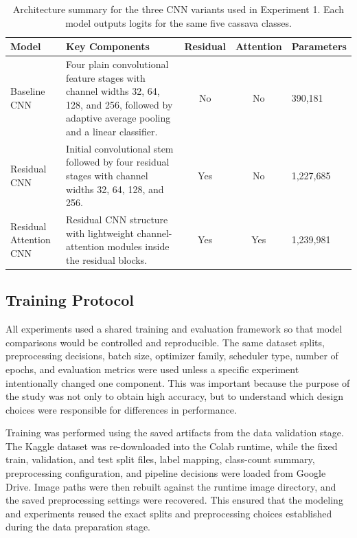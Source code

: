 \documentclass[11pt]{article}
\begin{document}
\begin{table}[htbp]
    \centering
    \small
    \caption{Architecture summary for the three CNN variants used in Experiment 1. Each model outputs logits for the same five cassava classes.}
    \label{tab:architecture_summary}
    \begin{tabularx}{\textwidth}{L{0.20\textwidth}>{\raggedright\arraybackslash}XccL{0.13\textwidth}}
        \toprule
        Model & Key Components & Residual & Attention & Parameters \\
        \midrule
        Baseline CNN 
        & Four plain convolutional feature stages with channel widths 32, 64, 128, and 256, followed by adaptive average pooling and a linear classifier. 
        & No & No & 390,181 \\
        \addlinespace
        Residual CNN 
        & Initial convolutional stem followed by four residual stages with channel widths 32, 64, 128, and 256. 
        & Yes & No & 1,227,685 \\
        \addlinespace
        Residual Attention CNN 
        & Residual CNN structure with lightweight channel-attention modules inside the residual blocks. 
        & Yes & Yes & 1,239,981 \\
        \bottomrule
    \end{tabularx}
\end{table}

\subsection{Training Protocol}

All experiments used a shared training and evaluation framework so that model comparisons would be controlled and reproducible. The same dataset splits, preprocessing decisions, batch size, optimizer family, scheduler type, number of epochs, and evaluation metrics were used unless a specific experiment intentionally changed one component. This was important because the purpose of the study was not only to obtain high accuracy, but to understand which design choices were responsible for differences in performance.

Training was performed using the saved artifacts from the data validation stage. The Kaggle dataset was re-downloaded into the Colab runtime, while the fixed train, validation, and test split files, label mapping, class-count summary, preprocessing configuration, and pipeline decisions were loaded from Google Drive. Image paths were then rebuilt against the runtime image directory, and the saved preprocessing settings were recovered. This ensured that the modeling and experiments reused the exact splits and preprocessing choices established during the data preparation stage.
\end{document}
